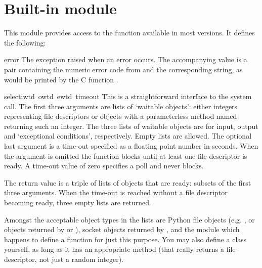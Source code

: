 \section{Built-in module }

This module provides access to the function  available in
most \UNIX{} versions.  It defines the following:

\renewcommand{\indexsubitem}{(in module select)}
\begin{excdesc}{error}
The exception raised when an error occurs.  The accompanying value is
a pair containing the numeric error code from  and the
corresponding string, as would be printed by the C function
.
\end{excdesc}

\begin{funcdesc}{select}{iwtd\, owtd\, ewtd\, timeout}
This is a straightforward interface to the \UNIX{} 
system call.  The first three arguments are lists of `waitable
objects': either integers representing \UNIX{} file descriptors or
objects with a parameterless method named  returning
such an integer.  The three lists of waitable objects are for input,
output and `exceptional conditions', respectively.  Empty lists are
allowed.  The optional last argument is a time-out specified as a
floating point number in seconds.  When the  argument
is omitted the function blocks until at least one file descriptor is
ready.  A time-out value of zero specifies a poll and never blocks.

The return value is a triple of lists of objects that are ready:
subsets of the first three arguments.  When the time-out is reached
without a file descriptor becoming ready, three empty lists are
returned.

Amongst the acceptable object types in the lists are Python file
objects (e.g. , or objects returned by 
or ), socket objects returned by
, and the module  which happens to
define a function  for just this purpose.  You may
also define a  class yourself, as long as it has an
appropriate  method (that really returns a \UNIX{} file
descriptor, not just a random integer).
\end{funcdesc}
